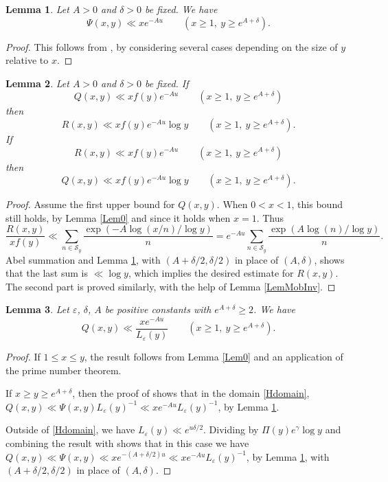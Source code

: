 \documentclass[11pt]{amsart}
\newtheorem{lemma}{Lemma}
\begin{document}
\begin{lemma}\label{PsiLem}
Let $A>0$ and $\delta>0$ be fixed. We have
$$
\Psi(x,y) \ll x e^{-Au} \qquad (x\ge 1, \ y\ge e^{A+\delta}).
$$
\end{lemma}
\begin{proof}
This follows from \cite[Thm III.5.2 \& Eq III.5.35]{Ten}, by considering several cases depending on the size of $y$ relative to $x$. 
\end{proof}


\begin{lemma}\label{LemRQ}
Let $A>0$ and $\delta>0$ be fixed. If
$$
Q(x,y) \ll x f(y) e^{-A u} \qquad (x\ge 1,\  y\ge e^{A+\delta})
$$
then
$$
R(x,y)  \ll x f(y) e^{-A u}  \log y \qquad (x\ge 1,\  y\ge e^{A+\delta}).
$$
 If
$$
R(x,y) \ll x f(y) e^{-A u} \qquad (x\ge 1,\  y\ge e^{A+\delta})
$$
then
$$
Q(x,y)  \ll x f(y) e^{-A u}  \log y \qquad (x\ge 1,\  y\ge e^{A+\delta}).
$$
\end{lemma}
\begin{proof}
Assume the first upper bound for $Q(x,y)$. When $0<x<1$, this bound still holds, 
by Lemma \ref{Lem0} and since it holds when $x=1$. Thus 
$$
\frac{R(x,y)}{x f(y)} \ll \sum_{n\in \mathcal{S}_y} \frac{ \exp(-A\log(x/n)/\log y)}{n}
= e^{-Au} \sum_{n\in \mathcal{S}_y} \frac{\exp(A\log(n)/\log y)}{n }.
$$
Abel summation and Lemma \ref{PsiLem}, with $(A+\delta/2,\delta/2)$ in place of $(A,\delta)$, 
shows that the last sum is $\ll \log y$, which implies the desired estimate for $R(x,y)$. 
The second part is proved similarly, with the help of Lemma \ref{LemMobInv}.
\end{proof}


\begin{lemma}\label{PhiLem}
Let $\varepsilon$, $\delta$, $A$ be positive constants with $e^{A+\delta}\ge 2$. We have
$$
Q(x,y)\ll \frac{x e^{-A u}}{L_\varepsilon(y)}\qquad (x\ge 1, \ y\ge e^{A+\delta}).
$$
\end{lemma}
\begin{proof}
If $1\le x\le y$, the result follows from Lemma \ref{Lem0} and
 an application of the prime number theorem.

If $x\ge y\ge e^{A+\delta}$, then the proof of \cite[Thm III.6.10]{Ten} shows that in the domain \eqref{Hdomain},
  $Q(x,y) \ll \Psi(x,y) L_\varepsilon(y)^{-1} \ll x e^{-Au}  L_\varepsilon(y)^{-1}$, by Lemma \ref{PsiLem}.

Outside of \eqref{Hdomain}, we have  $L_\varepsilon(y)\ll e^{u \delta/2}$. 
Dividing \cite[Eq III.6.52]{Ten} by $\Pi(y) e^\gamma \log y$ and combining the result 
with \cite[Thm III.6.2]{Ten} shows that in this case we have
$Q(x,y) \ll \Psi(x,y) \ll x e^{-(A+\delta/2)u} \ll  x e^{-Au}  L_\varepsilon(y)^{-1}$, by Lemma \ref{PsiLem},
with $(A+\delta/2,\delta/2)$ in place of $(A,\delta)$.
\end{proof}
\end{document}
